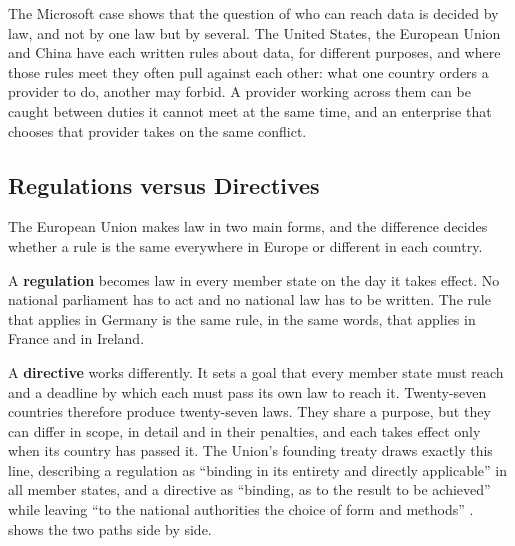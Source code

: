 The Microsoft case shows that the question of who can reach data is decided by
law, and not by one law but by several. The United States, the European Union and
China have each written rules about data, for different purposes, and where those
rules meet they often pull against each other: what one country orders a provider
to do, another may forbid. A provider working across them can be caught between
duties it cannot meet at the same time, and an enterprise that chooses that
provider takes on the same conflict.


\subsection{Regulations versus Directives}
\label{subsec:regulations-directives}

The European Union makes law in two main forms, and the difference decides whether
a rule is the same everywhere in Europe or different in each country.

A \textbf{regulation} becomes law in every member state on the day it takes
effect. No national parliament has to act and no national law has to be written.
The rule that applies in Germany is the same rule, in the same words, that applies
in France and in Ireland.

A \textbf{directive} works differently. It sets a goal that every member state must
reach and a deadline by which each must pass its own law to reach it. Twenty-seven
countries therefore produce twenty-seven laws. They share a purpose, but they can
differ in scope, in detail and in their penalties, and each takes effect only when
its country has passed it. The Union's founding treaty draws exactly this line,
describing a regulation as \enquote{binding in its entirety and directly
applicable} in all member states, and a directive as \enquote{binding, as to the
result to be achieved} while leaving \enquote{to the national authorities the
choice of form and methods} \cite{TFEU_Art288}.  shows the
two paths side by side.

